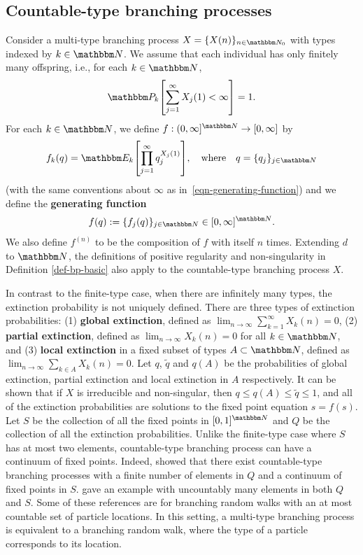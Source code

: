 \documentclass[11pt]{article}
\theoremstyle{plain}
\theoremstyle{definition}
\numberwithin{equation}{section}
\newcommand{\eqb}{\begin{equation}}
\newcommand{\eqe}{\end{equation}}
\newcommand{\eqbn}{\begin{equation*}}
\newcommand{\eqen}{\end{equation*}}
\newcommand{\BB}{\mathbbm}
\let\originalleft\left
\let\originalright\right
\renewcommand{\left}{\mathopen{}\mathclose\bgroup\originalleft}
\renewcommand{\right}{\aftergroup\egroup\originalright}
\begin{document}
\subsection{Countable-type branching processes} 
\label{sec-ctble-type}
Consider a multi-type branching process $X = \{X(n)\}_{n \in \BB N_0}$ with types indexed by $k\in \BB N$. 
We assume that each individual has only finitely many offspring, i.e., for each $k \in \BB N$, 
\eqb \label{eqn-finite-offspring} 
\BB P_k \left[ \sum_{j=1}^\infty X_j(1)  < \infty \right] = 1 .
\eqe 
For each $k\in \BB N$, we define $f : (0,\infty]^{\BB N  } \to [0,\infty]$ by 
\eqbn
f_k(q)  = \BB E_k\left[\prod_{j=1}^\infty q_j^{X_j(1)} \right] ,\quad \text{where} \quad q = \{q_j\}_{j\in\BB N }  
\eqen
(with the same conventions about $\infty$ as in~\eqref{eqn-generating-function}) and we define the \textbf{generating function} \eqbn
f(q) := \{f_j(q)\}_{j\in\BB N} \in [0,\infty]^{\BB N} . 
\eqen
We also define $f^{(n)}$ to be the composition of $f$ with itself $n$ times. 
Extending $d$ to $\BB N$, the definitions of positive regularity and non-singularity in Definition \ref{def-bp-basic} also apply to the countable-type branching process $X$. 

In contrast to the finite-type case, when there are infinitely many types, the extinction probability is not uniquely defined. There are three types of extinction probabilities: (1) \textbf{global extinction},  defined as $\lim_{n\to\infty} \sum_{k=1}^\infty X_k(n) = 0$, (2)  \textbf{partial extinction}, defined as $\lim_{n \to \infty} X_k(n)=0$ for all $k \in \BB N$, and (3) \textbf{local extinction} in a fixed subset of types $A \subset {\BB N}$, defined as $\lim_{n\to\infty} \sum_{k\in A} X_k(n)=0$. Let $q$, $\tilde{q}$ and $q(A)$ be the probabilities of global extinction, partial extinction and local extinction in $A$ respectively. It can be shown that if $X$ is irreducible and non-singular, then $q\leq q(A)\leq \tilde{q} \leq 1$, and all of the extinction probabilities are solutions to the fixed point equation $s=f(s)$. Let $S$ be the collection of all the fixed points in $[0,1]^{\BB N}$ and $Q$ be the collection of all the extinction probabilities. Unlike the finite-type case where $S$ has at most two elements, countable-type branching process can have a continuum of fixed points. Indeed,  \cite{Bertacchi2014, Bertacchi2017, Braunsteins2019} showed that there exist countable-type branching processes with a finite number of elements in $Q$ and a continuum of fixed points in $S$.  \cite{Bertacchi2020} gave an example with uncountably many elements in both $Q$ and $S$. Some of these references are for branching random walks with an at most countable set of particle locations. In this setting, a multi-type branching process is equivalent to a branching random walk, where the type of a particle corresponds to its location.
\end{document}
